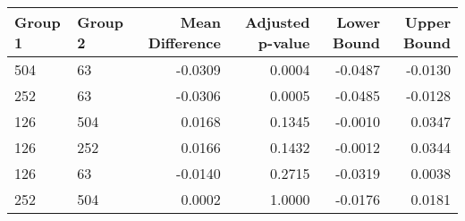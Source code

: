 \begin{tabular}{llrrrr}
\toprule
Group 1 & Group 2 & Mean Difference & Adjusted p-value & Lower Bound & Upper Bound \\
\midrule
504 & 63 & -0.0309 & 0.0004 & -0.0487 & -0.0130 \\
252 & 63 & -0.0306 & 0.0005 & -0.0485 & -0.0128 \\
126 & 504 & 0.0168 & 0.1345 & -0.0010 & 0.0347 \\
126 & 252 & 0.0166 & 0.1432 & -0.0012 & 0.0344 \\
126 & 63 & -0.0140 & 0.2715 & -0.0319 & 0.0038 \\
252 & 504 & 0.0002 & 1.0000 & -0.0176 & 0.0181 \\
\bottomrule
\end{tabular}
